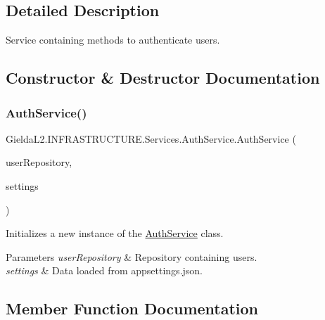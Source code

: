 \subsection{Detailed Description}
Service containing methods to authenticate users. 



\subsection{Constructor \& Destructor Documentation}
\mbox{\label{class_gielda_l2_1_1_i_n_f_r_a_s_t_r_u_c_t_u_r_e_1_1_services_1_1_auth_service_a6a30d7fd76c76e6119bc157dcc319bea}} 
\subsubsection{\texorpdfstring{AuthService()}{AuthService()}}
{\footnotesize\ttfamily Gielda\+L2.\+I\+N\+F\+R\+A\+S\+T\+R\+U\+C\+T\+U\+R\+E.\+Services.\+Auth\+Service.\+Auth\+Service (\begin{DoxyParamCaption}\item[{\mbox{\hyperlink{interface_gielda_l2_1_1_d_b_1_1_interfaces_1_1_i_user_repository}{I\+User\+Repository}}}]{user\+Repository,  }\item[{I\+Options$<$ \mbox{\hyperlink{class_gielda_l2_1_1_i_n_f_r_a_s_t_r_u_c_t_u_r_e_1_1_helpers_1_1_app_settings}{App\+Settings}} $>$}]{settings }\end{DoxyParamCaption})}



Initializes a new instance of the \mbox{\hyperlink{class_gielda_l2_1_1_i_n_f_r_a_s_t_r_u_c_t_u_r_e_1_1_services_1_1_auth_service}{Auth\+Service}} class. 


\begin{DoxyParams}{Parameters}
{\em user\+Repository} & Repository containing users.\\
\hline
{\em settings} & Data loaded from appsettings.\+json.\\
\hline
\end{DoxyParams}


\subsection{Member Function Documentation}
\mbox{\label{class_gielda_l2_1_1_i_n_f_r_a_s_t_r_u_c_t_u_r_e_1_1_services_1_1_auth_service_a11f0907fef09930d6533a6f6287d49ba}} 

